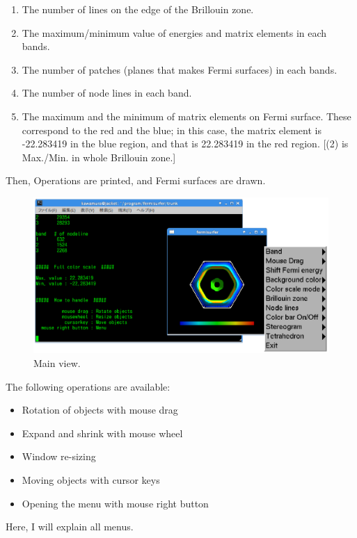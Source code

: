 \documentclass[12pt]{article}
\begin{document}
\begin{enumerate}
  \renewcommand{\labelenumi}{(\arabic{enumi})}
  \item The number of lines on the edge of the Brillouin zone.
  \item The maximum/minimum value of energies and matrix elements in each bands.
  \item The number of patches (planes that makes Fermi surfaces) in each bands.
  \item The number of node lines in each band.
  \item The maximum and the minimum of matrix elements on 
    Fermi surface.
    These correspond to the red and the blue;
    in this case, the matrix element is -22.283419 in the blue region,
    and that is 22.283419 in the red region.
    [(2) is Max./Min. in whole Brillouin zone.]    
\end{enumerate}

Then, Operations are printed, and
Fermi surfaces are drawn.

\begin{figure}[!ht]
  \includegraphics[width=17cm]{figs/start.eps}
  \caption{Main view.}
  \label{fig_start}
\end{figure}

The following operations are available:
\begin{itemize}
\item Rotation of objects with mouse drag
\item Expand and shrink with mouse wheel
\item Window re-sizing
\item Moving objects with cursor keys
\item Opening the menu with mouse right button
\end{itemize}

Here, I will explain all menus.
\end{document}
